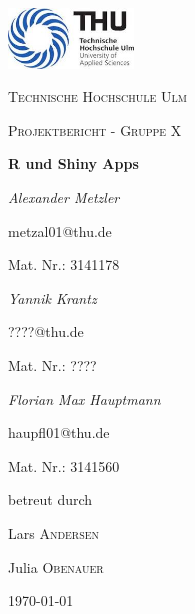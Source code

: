 \documentclass[12pt]{IEEEtran}
\begin{document}
\begin{titlepage}
	\centering
	\includegraphics[width=0.25\textwidth]{images/THU}\par\vspace{1cm}
	{\scshape\LARGE Technische Hochschule Ulm \par}
	\vspace{1cm}
	{\scshape\Large Projektbericht - Gruppe X\par}
	\vspace{1.5cm}
	{\huge\bfseries R und Shiny Apps\par}
	\vspace{2cm}
	{\Large\itshape Alexander Metzler\par}
	{\Large metzal01@thu.de\par}
	{\Large Mat. Nr.: 3141178\par}
	\vspace{0.5cm}
	{\Large\itshape Yannik Krantz\par}
	{\Large ????@thu.de\par}
	{\Large Mat. Nr.: ????\par}
	\vspace{0.5cm}
	{\Large\itshape Florian Max Hauptmann\par}
	{\Large haupfl01@thu.de\par}
	{\Large Mat. Nr.:  3141560\par}
	\vfill
	betreut durch\par
	Lars \textsc{Andersen}\par
	Julia \textsc{Obenauer}
	
	\vfill
	
	{\large \today\par}
\end{titlepage}	
\onecolumn
\tableofcontents
\pagebreak


\end{document}

